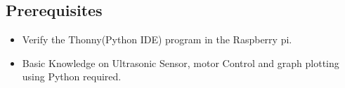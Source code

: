 



\subsection*{\Large Prerequisites}
    \begin{itemize}
        \item Verify the  Thonny(Python IDE) program in the Raspberry pi.
        \item  Basic Knowledge on Ultrasonic Sensor, motor Control and graph plotting using Python required.
    \end{itemize}

